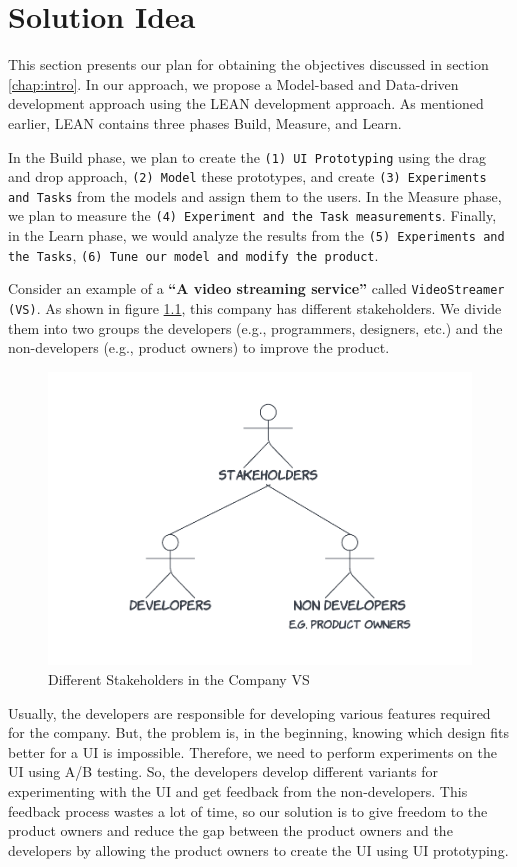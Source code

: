 \chapter{Solution Idea} \label{chap:solutionideas}

This section presents our plan for obtaining the objectives discussed in section \ref{chap:intro}. 
In our approach, we propose a Model-based and Data-driven development approach using the LEAN development approach. As mentioned earlier, LEAN contains three phases Build, Measure, and Learn.

In the Build phase, we plan to create the \texttt{(1) UI Prototyping} using the drag and drop approach, \texttt{(2) Model} these prototypes, and create \texttt{(3) Experiments and Tasks} from the models and assign them to the users.
In the Measure phase, we plan to measure the \texttt{(4) Experiment and the Task measurements}.
Finally, in the Learn phase, we would analyze the results from the \texttt{(5) Experiments and the Tasks}, \texttt{(6) Tune our model and modify the product}.  

Consider an example of a \textbf{``A video streaming service''} called \texttt{VideoStreamer (VS)}.
As shown in figure \ref{solutionideas:fig:stakeholders}, this company has different stakeholders. 
We divide them into two groups the developers (e.g., programmers, designers, etc.) and the non-developers (e.g., product owners) to improve the product.
\begin{figure}
    \centering
    \includegraphics[scale=0.2]{images/solution-ideas/Stakeholder.png}
    \caption{Different Stakeholders in the Company VS}
    \label{solutionideas:fig:stakeholders}
\end{figure}
Usually, the developers are responsible for developing various features required for the company. 
But, the problem is, in the beginning, knowing which design fits better for a UI is impossible. 
Therefore, we need to perform experiments on the UI using A/B testing.
So, the developers develop different variants for experimenting with the UI and get feedback from the non-developers.
This feedback process wastes a lot of time, so our solution is to give freedom to the product owners and reduce the gap between the product owners and the developers by allowing the product owners to create the UI using UI prototyping.

